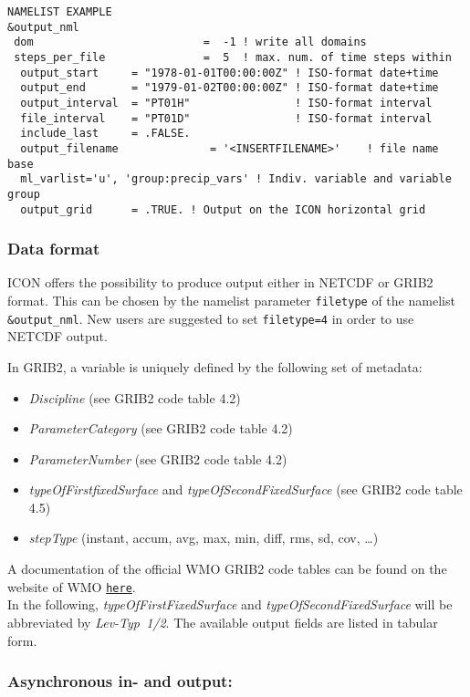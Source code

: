 \begin{Verbatim}[frame=single]
NAMELIST EXAMPLE
&output_nml
 dom                          =  -1 ! write all domains
 steps_per_file               =  5  ! max. num. of time steps within
  output_start     = "1978-01-01T00:00:00Z" ! ISO-format date+time
  output_end       = "1979-01-02T00:00:00Z" ! ISO-format date+time
  output_interval  = "PT01H"                ! ISO-format interval
  file_interval    = "PT01D"                ! ISO-format interval
  include_last     = .FALSE.
  output_filename              = '<INSERTFILENAME>'    ! file name base
  ml_varlist='u', 'group:precip_vars' ! Indiv. variable and variable group
  output_grid      = .TRUE. ! Output on the ICON horizontal grid
\end{Verbatim}
 

\subsubsection{Data format}


ICON offers the possibility to produce output either in NETCDF or GRIB2 format. This can be chosen by the namelist parameter \verb+filetype+ of the namelist \verb+&output_nml+. New users are suggested to set \verb+filetype=4+ in order to use NETCDF output.

In GRIB2, a variable is uniquely defined by the following set of metadata:
\begin{itemize}
 \item \textit{Discipline} (see GRIB2 code table 4.2)
 \item \textit{ParameterCategory} (see GRIB2 code table 4.2)
 \item \textit{ParameterNumber} (see GRIB2 code table 4.2)
 \item \textit{typeOfFirstfixedSurface} and \textit{typeOfSecondFixedSurface} (see GRIB2 code table 4.5)
 \item \textit{stepType} (instant, accum, avg, max, min, diff, rms, sd, cov, \dots)
\end{itemize}
A documentation of the official WMO GRIB2 code tables can be found on the website of WMO \href{http://www.wmo.int/pages/prog/www/WMOCodes/WMO306_vI2/LatestVERSION/WMO306_vI2_GRIB2_CodeFlag_en.pdf} {\tt here}.\\
In the following, \textit{typeOfFirstFixedSurface} and \textit{typeOfSecondFixedSurface} will be abbreviated by \textit{Lev-Typ~1/2}. The available output fields are listed in tabular form.


\subsubsection*{Asynchronous in- and  output:} 

